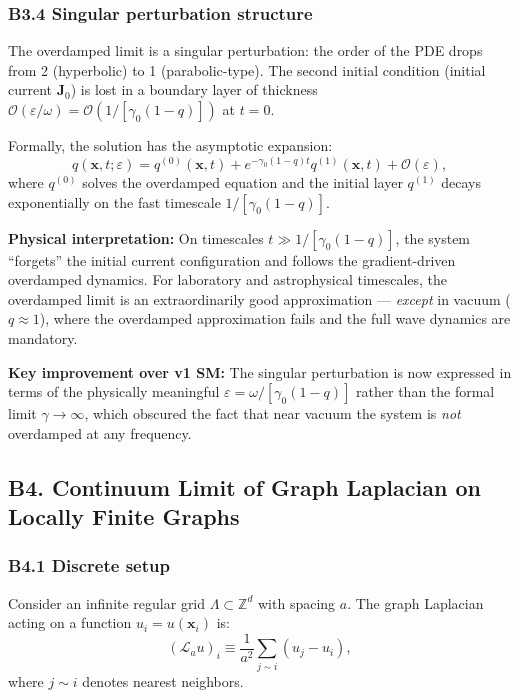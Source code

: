 \documentclass[reprint]{revtex4-2}
\begin{document}
\subsubsection{B3.4 Singular perturbation structure}

The overdamped limit is a singular perturbation: the order of the PDE drops from 2 (hyperbolic) to 1 (parabolic-type). The second initial condition (initial current $\mathbf{J}_0$) is lost in a boundary layer of thickness $\mathcal{O}(\varepsilon/\omega) = \mathcal{O}(1/[\gamma_0(1-q)])$ at $t=0$.

Formally, the solution has the asymptotic expansion:
\begin{equation}
q(\mathbf{x},t;\varepsilon) = q^{(0)}(\mathbf{x},t) + e^{-\gamma_0(1-q)t}q^{(1)}(\mathbf{x},t) + \mathcal{O}(\varepsilon),
\end{equation}
where $q^{(0)}$ solves the overdamped equation and the initial layer $q^{(1)}$ decays exponentially on the fast timescale $1/[\gamma_0(1-q)]$.

\textbf{Physical interpretation:} On timescales $t \gg 1/[\gamma_0(1-q)]$, the system ``forgets'' the initial current configuration and follows the gradient-driven overdamped dynamics. For laboratory and astrophysical timescales, the overdamped limit is an extraordinarily good approximation --- \emph{except} in vacuum ($q\approx 1$), where the overdamped approximation fails and the full wave dynamics are mandatory.

\textbf{Key improvement over v1 SM:} The singular perturbation is now expressed in terms of the physically meaningful $\varepsilon = \omega/[\gamma_0(1-q)]$ rather than the formal limit $\gamma\to\infty$, which obscured the fact that near vacuum the system is \emph{not} overdamped at any frequency.

\subsection{B4. Continuum Limit of Graph Laplacian on Locally Finite Graphs}

\subsubsection{B4.1 Discrete setup}

Consider an infinite regular grid $\Lambda \subset \mathbb{Z}^d$ with spacing $a$. The graph Laplacian acting on a function $u_i = u(\mathbf{x}_i)$ is:
\begin{equation}
(\mathcal{L}_a u)_i \equiv \frac{1}{a^2}\sum_{j \sim i} (u_j - u_i),
\end{equation}
where $j\sim i$ denotes nearest neighbors.
\end{document}
